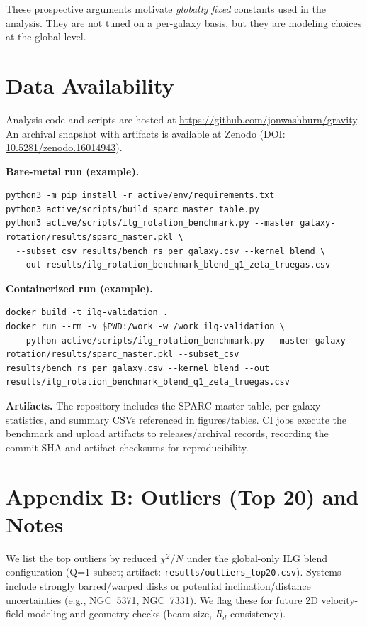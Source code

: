 \documentclass[12pt,a4paper]{article}
\begin{document}
These prospective arguments motivate \emph{globally fixed} constants used in the analysis. They are not tuned on a per-galaxy basis, but they are modeling choices at the global level.

\section*{Data Availability}
\noindent
Analysis code and scripts are hosted at \href{https://github.com/jonwashburn/gravity}{https://github.com/jonwashburn/gravity}. An archival snapshot with artifacts is available at Zenodo (DOI: \href{https://doi.org/10.5281/zenodo.16014943}{10.5281/zenodo.16014943}).

\noindent\textbf{Bare-metal run (example).}
\begin{verbatim}
python3 -m pip install -r active/env/requirements.txt
python3 active/scripts/build_sparc_master_table.py
python3 active/scripts/ilg_rotation_benchmark.py --master galaxy-rotation/results/sparc_master.pkl \
  --subset_csv results/bench_rs_per_galaxy.csv --kernel blend \
  --out results/ilg_rotation_benchmark_blend_q1_zeta_truegas.csv
\end{verbatim}

\noindent\textbf{Containerized run (example).}
\begin{verbatim}
docker build -t ilg-validation .
docker run --rm -v $PWD:/work -w /work ilg-validation \
    python active/scripts/ilg_rotation_benchmark.py --master galaxy-rotation/results/sparc_master.pkl --subset_csv results/bench_rs_per_galaxy.csv --kernel blend --out results/ilg_rotation_benchmark_blend_q1_zeta_truegas.csv
\end{verbatim}

\noindent\textbf{Artifacts.} The repository includes the SPARC master table, per-galaxy statistics, and summary CSVs referenced in figures/tables. CI jobs execute the benchmark and upload artifacts to releases/archival records, recording the commit SHA and artifact checksums for reproducibility.

\section*{Appendix B: Outliers (Top 20) and Notes}
\noindent We list the top outliers by reduced $\chi^2/N$ under the global-only ILG blend configuration (Q=1 subset; artifact: \texttt{results/outliers\_top20.csv}). Systems include strongly barred/warped disks or potential inclination/distance uncertainties (e.g., NGC~5371, NGC~7331). We flag these for future 2D velocity-field modeling and geometry checks (beam size, $R_d$ consistency).
\end{document}
